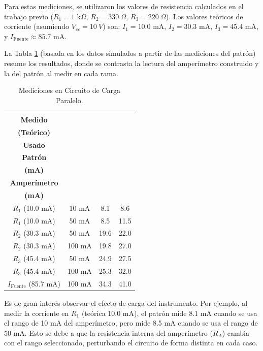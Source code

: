 Para estas mediciones, se utilizaron los valores de resistencia calculados en el trabajo previo ($R_1=1\text{ k}\Omega$, $R_2=330~\Omega$, $R_3=220~\Omega$). Los valores teóricos de corriente (asumiendo $V_{cc}=10~V$) son: $I_1 = 10.0$ mA, $I_2 = 30.3$ mA, $I_3 = 45.4$ mA, y $I_{\text{Fuente}} \approx 85.7$ mA.

La Tabla \ref{tab:paralelo} (basada en los datos simulados a partir de las mediciones del patrón) resume los resultados, donde se contrasta la lectura del amperímetro construido y la del patrón al medir en cada rama.

\begin{table}[h!]
    \centering
    \caption{Mediciones en Circuito de Carga Paralelo.}
    \label{tab:paralelo}
    \begin{tabular}{cccc}
        \toprule
        \makecell{\textbf{Elemento}\\\textbf{Medido}\\\textbf{(Teórico)}} & 
        \makecell{\textbf{Rango}\\\textbf{Usado}} & 
        \makecell{\textbf{Corriente}\\\textbf{Patrón}\\\textbf{(mA)}} & 
        \makecell{\textbf{Lectura}\\\textbf{Amperímetro}\\\textbf{(mA)}} \\
        \midrule
        $R_1$ (10.0 mA) & 10 mA & 8.1 & 8.6 \\
        $R_1$ (10.0 mA) & 50 mA & 8.5 & 11.5 \\
        \midrule
        $R_2$ (30.3 mA) & 50 mA & 19.6 & 22.0 \\
        $R_2$ (30.3 mA) & 100 mA & 19.8 & 27.0 \\
        \midrule
        $R_3$ (45.4 mA) & 50 mA & 24.9 & 27.5 \\
        $R_3$ (45.4 mA) & 100 mA & 25.3 & 32.0 \\
        \midrule
        $I_{\text{Fuente}}$ (85.7 mA) & 100 mA & 34.3 & 41.0 \\
        \bottomrule
    \end{tabular}
\end{table}


Es de gran interés observar el efecto de carga del instrumento. Por ejemplo, al medir la corriente en $R_1$ (teórica 10.0 mA), el patrón mide 8.1 mA cuando se usa el rango de 10 mA del amperímetro, pero mide 8.5 mA cuando se usa el rango de 50 mA. Esto se debe a que la resistencia interna del amperímetro ($R_A$) cambia con el rango seleccionado, perturbando el circuito de forma distinta en cada caso.

